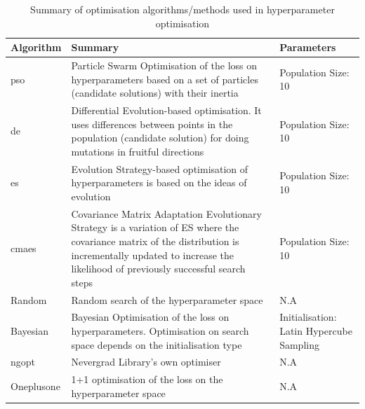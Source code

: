 \begin{table}[htbp] 
 \caption{Summary of optimisation algorithms/methods used in hyperparameter optimisation}
 \begin{tabular*}{\textwidth}{PFL}
 \toprule
 \textbf{Algorithm} & \textbf{Summary} & \textbf{Parameters} \\
 \midrule
 \gls{pso} \cite{zambrano-bigiarini_standard_2013} & Particle Swarm Optimisation of the loss on hyperparameters based on a set of particles (candidate solutions) with their inertia & Population Size: 10 \\
 \gls{de} \cite{price_differential_2005} & Differential Evolution-based optimisation. It uses differences between points in the population (candidate solution) for doing mutations in fruitful directions & Population Size: 10 \\
 \gls{es} \cite{emmerich_evolution_2018} & Evolution Strategy-based optimisation of hyperparameters is based on the ideas of evolution & Population Size: 10\\
 \gls{cmaes} \cite{emmerich_evolution_2018} & Covariance Matrix Adaptation Evolutionary Strategy is a variation of ES where the covariance matrix of the distribution is incrementally updated to increase the likelihood of previously successful search steps & Population Size: 10\\
 Random & Random search of the hyperparameter space & N.A \\
 Bayesian \cite{raponi_high_2020} & Bayesian Optimisation of the loss on hyperparameters. Optimisation on search space depends on the initialisation type & Initialisation: Latin Hypercube Sampling \\
 \gls{ngopt} \cite{rapin_nevergrad_2018} & Nevergrad Library's own optimiser & N.A \\
 Oneplusone \cite{rapin_nevergrad_2018} & 1+1 optimisation of the loss on the hyperparameter space & N.A\\
 \bottomrule
 \end{tabular*}
 \label{tab:optimiser_types}
\end{table}


